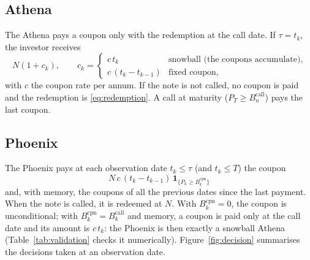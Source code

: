 \documentclass[11pt,a4paper]{article}
\newcommand{\ind}{\mathbf{1}}
\begin{document}
\subsection{Athena}
The Athena pays a coupon only with the redemption at the call date. If $\tau = t_k$, the investor receives
\begin{equation}
N(1 + c_k), \qquad c_k = \begin{cases} c\, t_k & \text{snowball (the coupons accumulate)}, \\ c\,(t_k - t_{k-1}) & \text{fixed coupon}, \end{cases}
\end{equation}
with $c$ the coupon rate per annum. If the note is not called, no coupon is paid and the redemption is
\eqref{eq:redemption}. A call at maturity ($P_T \ge B^{\mathrm{call}}_n$) pays the last coupon.

\subsection{Phoenix}
The Phoenix pays at each observation date $t_k \le \tau$ (and $t_k \le T$) the coupon
\begin{equation}
N\, c\,(t_k - t_{k-1})\, \ind_{\{P_k \ge B^{\mathrm{cpn}}_k\}}
\end{equation}
and, with memory, the coupons of all the previous dates since the last payment. When the note is called, it is
redeemed at $N$. With $B^{\mathrm{cpn}}_k = 0$, the coupon is unconditional; with
$B^{\mathrm{cpn}}_k = B^{\mathrm{call}}_k$ and memory, a coupon is paid only at the call date and its amount is
$c\, t_k$: the Phoenix is then exactly a snowball Athena (Table~\ref{tab:validation} checks it numerically).
Figure~\ref{fig:decision} summarises the decisions taken at an observation date.
\end{document}
